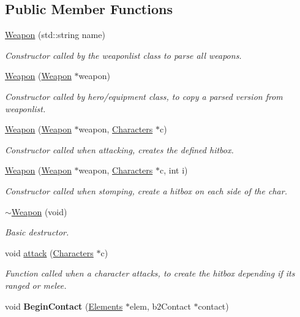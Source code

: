 \subsection*{Public Member Functions}
\begin{DoxyCompactItemize}
\item 
\hyperlink{class_weapon_a7267e890fa563b4f2df8746f443b461a}{Weapon} (std\+::string name)
\begin{DoxyCompactList}\small\item\em Constructor called by the weaponlist class to parse all weapons. \end{DoxyCompactList}\item 
\hyperlink{class_weapon_a559c41dbcc415a6ee70112f5231ef83b}{Weapon} (\hyperlink{class_weapon}{Weapon} $\ast$weapon)
\begin{DoxyCompactList}\small\item\em Constructor called by hero/equipment class, to copy a parsed version from weaponlist. \end{DoxyCompactList}\item 
\hyperlink{class_weapon_aa3eb21f28f64908763402004fa802b36}{Weapon} (\hyperlink{class_weapon}{Weapon} $\ast$weapon, \hyperlink{class_characters}{Characters} $\ast$c)
\begin{DoxyCompactList}\small\item\em Constructor called when attacking, creates the defined hitbox. \end{DoxyCompactList}\item 
\hyperlink{class_weapon_a8e89e432ab1ac28b9dba49adeb8d6eb8}{Weapon} (\hyperlink{class_weapon}{Weapon} $\ast$weapon, \hyperlink{class_characters}{Characters} $\ast$c, int i)
\begin{DoxyCompactList}\small\item\em Constructor called when stomping, create a hitbox on each side of the char. \end{DoxyCompactList}\item 
\hypertarget{class_weapon_aa3364fb5092bbdb4c215e02dd1494f10}{\hyperlink{class_weapon_aa3364fb5092bbdb4c215e02dd1494f10}{$\sim$\+Weapon} (void)}\label{class_weapon_aa3364fb5092bbdb4c215e02dd1494f10}

\begin{DoxyCompactList}\small\item\em Basic destructor. \end{DoxyCompactList}\item 
void \hyperlink{class_weapon_a90b2b26acbbfc87a14786c8859e4a01d}{attack} (\hyperlink{class_characters}{Characters} $\ast$c)
\begin{DoxyCompactList}\small\item\em Function called when a character attacks, to create the hitbox depending if its ranged or melee. \end{DoxyCompactList}\item 
\hypertarget{class_weapon_a866884395ed4c0e7a972bb18e8d7d030}{void {\bfseries Begin\+Contact} (\hyperlink{class_elements}{Elements} $\ast$elem, b2\+Contact $\ast$contact)}\label{class_weapon_a866884395ed4c0e7a972bb18e8d7d030}


\end{DoxyCompactItemize}
